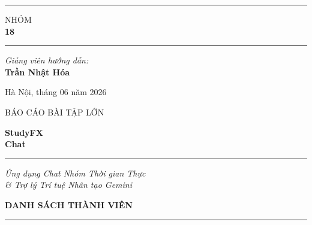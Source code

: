 \documentclass[12pt, a4paper, oneside]{report}
\begin{document}
\begin{titlepage}
\begin{minipage}[t][29.7cm][t]{6.6cm}
\begin{center}
    \vspace{1.2cm}
    \textcolor{accentgold}{\rule{3cm}{0.5pt}}
    \vspace{1.2cm}

    {\color{white!70}\fontsize{8pt}{12pt}\selectfont NHÓM}\\[4pt]
    {\color{white}\fontsize{36pt}{40pt}\selectfont\bfseries 18}

    \vspace{1.0cm}
    \textcolor{accentgold}{\rule{3cm}{0.5pt}}
    \vspace{1.0cm}

    {\color{white!80}\fontsize{8pt}{12pt}\selectfont\itshape
      Giảng viên hướng dẫn:\\[3pt]}
    {\color{white}\fontsize{9.5pt}{14pt}\selectfont
      \textbf{Trần Nhật Hóa}}

    \vspace*{\fill}
    {\color{white!60}\fontsize{8pt}{11pt}\selectfont
      Hà Nội, tháng 06 năm 2026}
    \vspace{1.5cm}
  \end{center}
\end{minipage}%
\hspace{0.18cm}%
\begin{minipage}[t][29.7cm][t]{\dimexpr\paperwidth-7.18cm-0.18cm\relax}
  \vspace{2.2cm}
  \begin{flushleft}
    {\color{hustblue!40}\fontsize{9pt}{13pt}\selectfont
      BÁO CÁO BÀI TẬP LỚN}

    \vspace{0.5cm}
    {\color{hustblue}\fontsize{30pt}{35pt}\selectfont\bfseries
      StudyFX\\Chat}

    \vspace{0.3cm}
    \textcolor{accentgold}{\rule{6cm}{2pt}}

    \vspace{0.6cm}
    {\color{darkgray}\fontsize{11pt}{16pt}\selectfont\itshape
      Ứng dụng Chat Nhóm Thời gian Thực\\
      \& Trợ lý Trí tuệ Nhân tạo Gemini}

    \vspace{1.8cm}
    {\color{hustblue}\fontsize{9pt}{13pt}\selectfont\bfseries
      DANH SÁCH THÀNH VIÊN}

    \vspace{0.4cm}
    \textcolor{midgray}{\rule{8cm}{0.4pt}}


\end{flushleft}
\end{minipage}
\end{titlepage}
\end{document}
